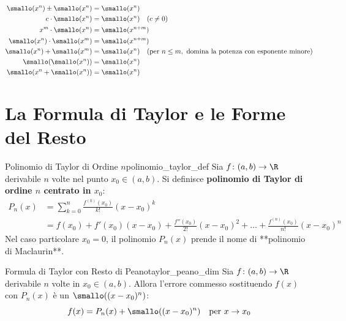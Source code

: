 \begin{metodo}
\begin{align*}
    \smallo(x^n) \pm \smallo(x^n) &= \smallo(x^n) \\
    c \cdot \smallo(x^n) &= \smallo(x^n) \quad (c \neq 0) \\
    x^m \cdot \smallo(x^n) &= \smallo(x^{n+m}) \\
    \smallo(x^n) \cdot \smallo(x^m) &= \smallo(x^{n+m}) \\
    \smallo(x^n) + \smallo(x^m) &= \smallo(x^n) \quad (\text{per } n \le m, \text{ domina la potenza con esponente minore}) \\
    \smallo(\smallo(x^n)) &= \smallo(x^n) \\
    \smallo(x^n + \smallo(x^n)) &= \smallo(x^n)
\end{align*}
\end{metodo}

\section{La Formula di Taylor e le Forme del Resto}
\label{sec:formula_taylor_teoria}

\begin{definizione}{Polinomio di Taylor di Ordine $n$}{polinomio_taylor_def}
Sia $f \colon (a, b) \to \R$ derivabile $n$ volte nel punto $x_0 \in (a, b)$. Si definisce \textbf{polinomio di Taylor di ordine $n$ centrato in $x_0$}:
\begin{align*}
    P_n(x) &= \sum_{k=0}^n \frac{f^{(k)}(x_0)}{k!} (x - x_0)^k \\
    &= f(x_0) + f'(x_0)(x - x_0) + \frac{f''(x_0)}{2!}(x - x_0)^2 + \dots + \frac{f^{(n)}(x_0)}{n!}(x - x_0)^n
\end{align*}
Nel caso particolare $x_0 = 0$, il polinomio $P_n(x)$ prende il nome di **polinomio di Maclaurin**.
\end{definizione}

\begin{teorema}{Formula di Taylor con Resto di Peano}{taylor_peano_dim}
Sia $f \colon (a, b) \to \R$ derivabile $n$ volte in $x_0 \in (a, b)$. Allora l'errore commesso sostituendo $f(x)$ con $P_n(x)$ è un $\smallo((x - x_0)^n)$:
\[
    f(x) = P_n(x) + \smallo((x - x_0)^n) \quad \text{per } x \to x_0
\]
\end{teorema}

